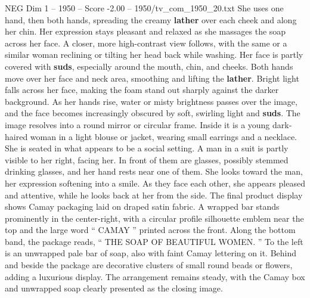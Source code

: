 \begin{textsample}{NEG Dim 1 – 1950 – Score -2.00 – 1950/tv\_com\_1950\_20.txt}
She uses one hand, then both hands, spreading the creamy \textbf{lather} over each cheek and along her chin.
Her expression stays pleasant and relaxed as she massages the soap across her face.
A closer, more high-contrast view follows, with the same or a similar woman reclining or tilting her head back while washing.
Her face is partly covered with \textbf{suds}, especially around the mouth, chin, and cheeks.
Both hands move over her face and neck area, smoothing and lifting the \textbf{lather}.
Bright light falls across her face, making the foam stand out sharply against the darker background.
As her hands rise, water or misty brightness passes over the image, and the face becomes increasingly obscured by soft, swirling light and \textbf{suds}.
The image resolves into a round mirror or circular frame.
Inside it is a young dark-haired woman in a light blouse or jacket, wearing small earrings and a necklace.
She is seated in what appears to be a social setting.
A man in a suit is partly visible to her right, facing her.
In front of them are glasses, possibly stemmed drinking glasses, and her hand rests near one of them.
She looks toward the man, her expression softening into a smile.
As they face each other, she appears pleased and attentive, while he looks back at her from the side.
The final product display shows Camay packaging laid on draped satin fabric.
A wrapped bar stands prominently in the center-right, with a circular profile silhouette emblem near the top and the large word “ CAMAY ” printed across the front.
Along the bottom band, the package reads, “ THE SOAP OF BEAUTIFUL WOMEN. ” To the left is an unwrapped pale bar of soap, also with faint Camay lettering on it.
Behind and beside the package are decorative clusters of small round beads or flowers, adding a luxurious display.
The arrangement remains steady, with the Camay box and unwrapped soap clearly presented as the closing image.

\end{textsample}
